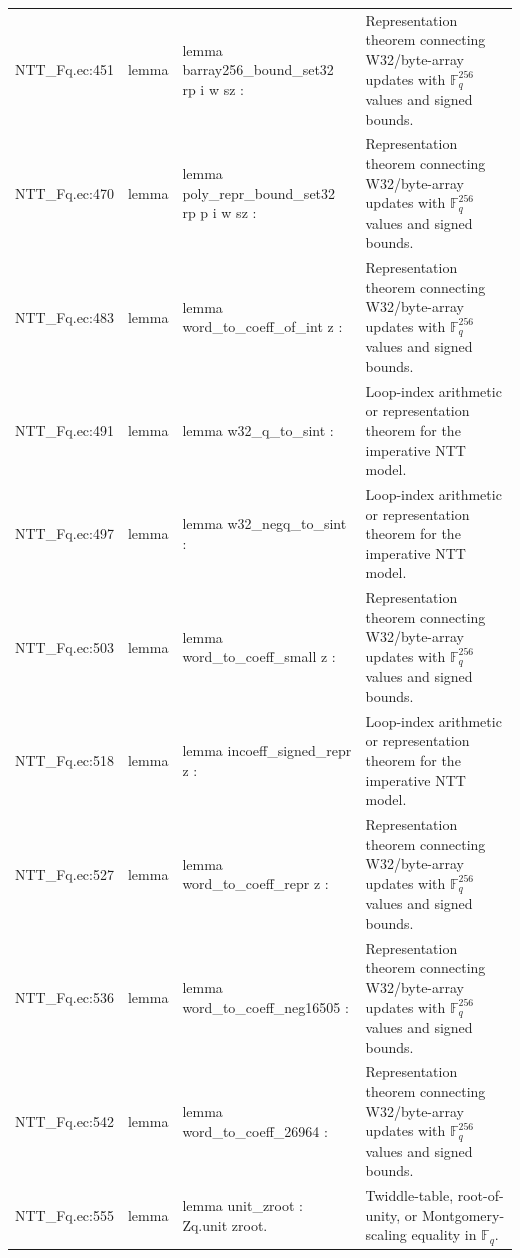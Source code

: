 \documentclass[10pt]{article}
\begin{document}
\begin{longtable}{L{0.11\textwidth}L{0.05\textwidth}L{0.38\textwidth}L{0.42\textwidth}}
NTT\_Fq.\allowbreak{}ec:\allowbreak{}451 & lemma & {\ttfamily\scriptsize lemma barray256\_bound\_set32 rp i w sz :} & Representation theorem connecting W32/byte-array updates with $\mathbb F_q^{256}$ values and signed bounds. \\
NTT\_Fq.\allowbreak{}ec:\allowbreak{}470 & lemma & {\ttfamily\scriptsize lemma poly\_repr\_bound\_set32 rp p i w sz :} & Representation theorem connecting W32/byte-array updates with $\mathbb F_q^{256}$ values and signed bounds. \\
NTT\_Fq.\allowbreak{}ec:\allowbreak{}483 & lemma & {\ttfamily\scriptsize lemma word\_to\_coeff\_of\_int z :} & Representation theorem connecting W32/byte-array updates with $\mathbb F_q^{256}$ values and signed bounds. \\
NTT\_Fq.\allowbreak{}ec:\allowbreak{}491 & lemma & {\ttfamily\scriptsize lemma w32\_q\_to\_sint :} & Loop-index arithmetic or representation theorem for the imperative NTT model. \\
NTT\_Fq.\allowbreak{}ec:\allowbreak{}497 & lemma & {\ttfamily\scriptsize lemma w32\_negq\_to\_sint :} & Loop-index arithmetic or representation theorem for the imperative NTT model. \\
NTT\_Fq.\allowbreak{}ec:\allowbreak{}503 & lemma & {\ttfamily\scriptsize lemma word\_to\_coeff\_small z :} & Representation theorem connecting W32/byte-array updates with $\mathbb F_q^{256}$ values and signed bounds. \\
NTT\_Fq.\allowbreak{}ec:\allowbreak{}518 & lemma & {\ttfamily\scriptsize lemma incoeff\_signed\_repr z :} & Loop-index arithmetic or representation theorem for the imperative NTT model. \\
NTT\_Fq.\allowbreak{}ec:\allowbreak{}527 & lemma & {\ttfamily\scriptsize lemma word\_to\_coeff\_repr z :} & Representation theorem connecting W32/byte-array updates with $\mathbb F_q^{256}$ values and signed bounds. \\
NTT\_Fq.\allowbreak{}ec:\allowbreak{}536 & lemma & {\ttfamily\scriptsize lemma word\_to\_coeff\_neg16505 :} & Representation theorem connecting W32/byte-array updates with $\mathbb F_q^{256}$ values and signed bounds. \\
NTT\_Fq.\allowbreak{}ec:\allowbreak{}542 & lemma & {\ttfamily\scriptsize lemma word\_to\_coeff\_26964 :} & Representation theorem connecting W32/byte-array updates with $\mathbb F_q^{256}$ values and signed bounds. \\
NTT\_Fq.\allowbreak{}ec:\allowbreak{}555 & lemma & {\ttfamily\scriptsize lemma unit\_zroot : Zq.unit zroot.} & Twiddle-table, root-of-unity, or Montgomery-scaling equality in $\mathbb F_q$. \\

\end{longtable}
\end{document}
